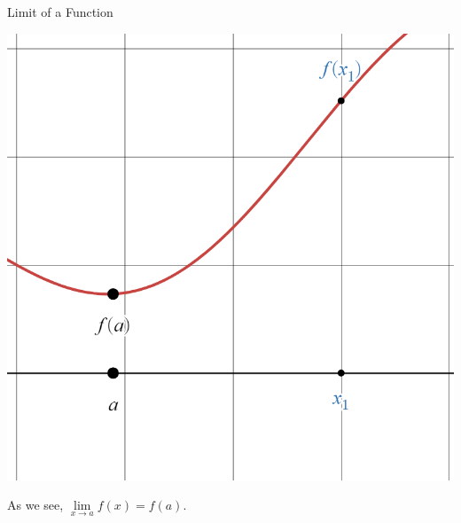 \documentclass{beamer}
\begin{document}
\begin{frame}{Limit of a Function}

      \begin{center}

    \includegraphics[height=0.75\textheight, keepaspectratio]{cont1.png}
  \end{center}

{\color{white} As we see, $\lim\limits_{x\to a} f(x) = f(a)$.}

\end{frame}
\end{document}
